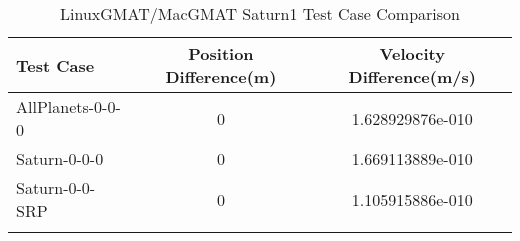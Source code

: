 \begin{table}[htbp!]
\centering
\caption{ LinuxGMAT/MacGMAT Saturn1 Test Case Comparison}
      \begin{tabular}{lcc}
      \hline\hline
          Test Case & Position Difference(m) & Velocity Difference(m/s) \\
         \hline
         AllPlanets-0-0-0 & 0 & 1.628929876e-010 \\
         Saturn-0-0-0 & 0 & 1.669113889e-010 \\
         Saturn-0-0-SRP & 0 & 1.105915886e-010 \\
      \hline\hline
      \label{Table: Saturn1 LinuxGMAT-MacGMAT Table} 
\end{tabular}
\end{table}
